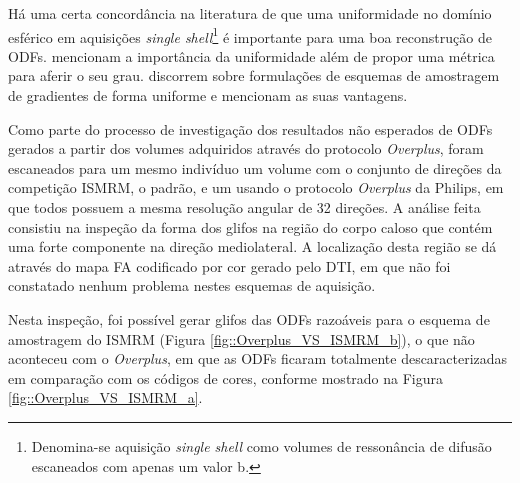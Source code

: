 \documentclass[
    12pt,                %
    oneside,            %
    a4paper,            %
    english,            %
    french,                %
    spanish,            %
    brazil                %
    ]{abntex2}
\begin{document}
Há uma certa concordância na literatura de que uma uniformidade no domínio esférico em aquisições \textit{single shell}\footnote{Denomina-se aquisição \textit{single shell} como volumes de ressonância de difusão escaneados com apenas um valor b.} é importante para uma boa reconstrução de ODFs.  mencionam a importância da uniformidade além de propor uma métrica para aferir o seu grau.  discorrem sobre formulações de esquemas de amostragem de gradientes de forma uniforme e mencionam as suas vantagens.

Como parte do processo de investigação dos resultados não esperados de ODFs gerados a partir dos volumes adquiridos através do protocolo \textit{Overplus}, foram escaneados para um mesmo indivíduo um volume com o conjunto de direções da competição ISMRM, o padrão, e um usando o protocolo \textit{Overplus} da Philips, em que todos possuem a mesma resolução angular de 32 direções. A análise feita consistiu na inspeção da forma dos glifos na região do corpo caloso que contém uma forte componente na direção mediolateral. A localização desta região se dá através do mapa FA codificado por cor gerado pelo DTI, em que não foi constatado nenhum problema nestes esquemas de aquisição.


Nesta inspeção, foi possível gerar glifos das ODFs razoáveis para o esquema de amostragem do ISMRM (Figura \ref{fig::Overplus_VS_ISMRM_b}), o que não aconteceu com o \textit{Overplus}, em que as ODFs ficaram totalmente descaracterizadas em comparação com os códigos de cores, conforme mostrado na Figura \ref{fig::Overplus_VS_ISMRM_a}.
\end{document}
